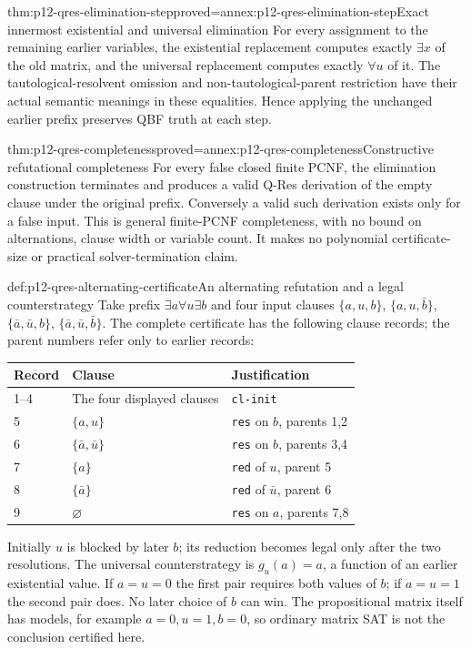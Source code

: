 \begin{hblemma}{thm:p12-qres-elimination-step}{proved=annex:p12-qres-elimination-step}{Exact innermost existential and universal elimination}
For every assignment to the remaining earlier variables, the existential
replacement computes exactly \(\exists x\) of the old matrix, and the
universal replacement computes exactly \(\forall u\) of it.  The
tautological-resolvent omission and non-tautological-parent restriction have
their actual semantic meanings in these equalities.  Hence applying the
unchanged earlier prefix preserves QBF truth at each step.
\end{hblemma}

\begin{hbtheorem}{thm:p12-qres-completeness}{proved=annex:p12-qres-completeness}{Constructive refutational completeness}
For every false closed finite PCNF, the elimination construction terminates
and produces a valid Q-Res derivation of the empty clause under the original
prefix.  Conversely a valid such derivation exists only for a false input.
This is general finite-PCNF completeness, with no bound on alternations,
clause width or variable count.  It makes no polynomial certificate-size
or practical solver-termination claim.
\end{hbtheorem}

\begin{hbexample}{def:p12-qres-alternating-certificate}{An alternating refutation and a legal counterstrategy}
Take prefix \(\exists a\forall u\exists b\) and four input clauses
\(\{a,u,b\}\), \(\{a,u,\bar b\}\),
\(\{\bar a,\bar u,b\}\), \(\{\bar a,\bar u,\bar b\}\).
The complete certificate has the following clause records; the parent numbers
refer only to earlier records:
\begin{center}
\begin{tabular}{@{}lll@{}}
\toprule
Record & Clause & Justification \\
\midrule
1--4 & The four displayed clauses & \texttt{cl-init} \\
5 & \(\{a,u\}\) & \texttt{res} on \(b\), parents 1,2 \\
6 & \(\{\bar a,\bar u\}\) & \texttt{res} on \(b\), parents 3,4 \\
7 & \(\{a\}\) & \texttt{red} of \(u\), parent 5 \\
8 & \(\{\bar a\}\) & \texttt{red} of \(\bar u\), parent 6 \\
9 & \(\varnothing\) & \texttt{res} on \(a\), parents 7,8 \\
\bottomrule
\end{tabular}
\end{center}
Initially \(u\) is blocked by later \(b\); its reduction becomes legal
only after the two resolutions.  The universal counterstrategy is
\(g_u(a)=a\), a function of an earlier existential value.  If \(a=u=0\)
the first pair requires both values of \(b\); if \(a=u=1\) the second pair
does.  No later choice of \(b\) can win.  The propositional matrix itself
has models, for example \(a=0,u=1,b=0\), so ordinary matrix SAT is not
the conclusion certified here.
\end{hbexample}

